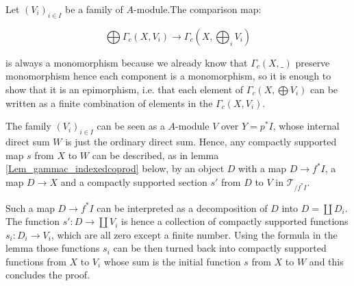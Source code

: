 \documentclass[a4paper]{article}
\newcommand{\Tcal}{\mathcal{T}}
\begin{document}
{{\begin{itemize}
Let $(V_i)_{i \in I}$ be a family of $A$-module.The comparison map:

\[ \bigoplus \Gamma_c(X,V_i) \rightarrow \Gamma_c \left( X, \bigoplus_i V_i \right) \]

is always a monomorphism because we already know that $\Gamma_c(X,\_)$ preserve monomorphism hence each component is a monomorphism, so it is enough to show that it is an epimorphism, i.e. that each element of $\Gamma_c \left( X, \bigoplus V_i \right)$ can be written as a finite combination of elements in the $\Gamma_c(X,V_i)$.

The family $(V_i)_{i \in I}$ can be seen as a $A$-module $V$ over $Y=p^* I$, whose internal direct sum $W$ is just the ordinary direct sum. Hence, any compactly supported map $s$ from $X$ to $W$ can be described, as in lemma \ref{Lem_gammac_indexedcoprod} below, by an object $D$ with a map $D \rightarrow f^* I$, a map $D \rightarrow X$ and a compactly supported section $s'$ from $D$ to $V$ in $\Tcal_{/f^*I}$.

Such a map $D \rightarrow f^* I$ can be interpreted as a decomposition of $D$ into $D =\coprod D_i$. The function $s' :D \rightarrow \coprod V_i$ is hence a collection of compactly supported functions $s_i : D_i \rightarrow V_i$, which are all zero except a finite number. Using the formula in the lemma those functions $s_i$ can be then turned back into compactly supported functions from $X$ to $V_i$ whose sum is the initial function $s$ from $X$ to $W$ and this concludes the proof. 


\end{itemize}

}
}
\end{document}
